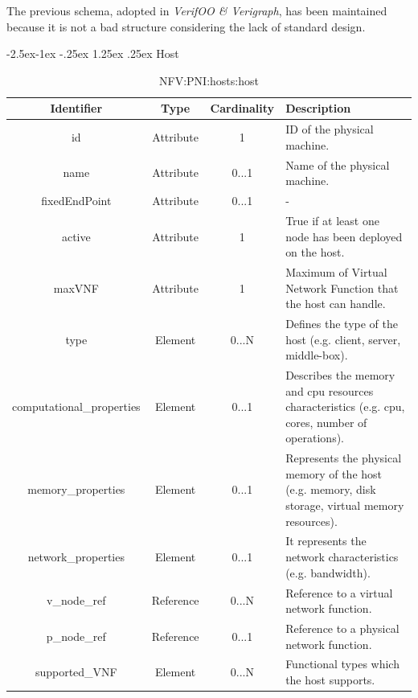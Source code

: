 \documentclass[11pt, english]{article}
\makeatletter
\renewcommand\paragraph{\@startsection{paragraph}{4}{\z@}%
            {-2.5ex\@plus -1ex \@minus -.25ex}%
            {1.25ex \@plus .25ex}%
            {\normalfont\normalsize\bfseries}}
\makeatother
\begin{document}
The previous schema, adopted in \emph{VerifOO \& Verigraph}, has been maintained  because it is not a bad structure considering the lack of standard design.

\paragraph{Host}

\begin{table}[ht]
    \centering
    \begin{tabular}{c|c|c|m{7cm}}
    \hline
    \rowcolor{white}
    Identifier & Type & Cardinality & Description \\
    \hline
    \rowcolor{Gray}
    id & Attribute & 1 & ID of the physical machine. \\
    \hline
    \rowcolor{white}
    name & Attribute & 0...1 & Name of the physical machine. \\
    \hline
    \rowcolor{Gray}
    fixedEndPoint & Attribute & 0...1 & - \\
    \hline
    \rowcolor{white}
    active & Attribute & 1 & True if at least one node has been deployed on the host. \\
    \hline
    \rowcolor{Gray}
    maxVNF & Attribute & 1 & Maximum of Virtual Network Function that the host can handle. \\
    \hline
    \rowcolor{white}
    type & Element & 0...N & Defines the type of the host (e.g. client, server, middle-box). \\
    \hline
    \rowcolor{Gray}
    computational\_properties & Element & 0...1 & Describes the memory and cpu resources characteristics (e.g. cpu, cores, number of operations). \\
    \hline
    \rowcolor{white}
    memory\_properties & Element & 0...1 & Represents the physical memory of the host (e.g. memory, disk storage, virtual memory resources). \\
    \hline
    \rowcolor{Gray}
    network\_properties & Element & 0...1 & It represents the network characteristics (e.g. bandwidth). \\
    \hline
    \rowcolor{white}
    v\_node\_ref & Reference & 0...N & Reference to a virtual network function. \\
    \hline
    \rowcolor{Gray}
    p\_node\_ref & Reference & 0...1 & Reference to a physical network function. \\
    \hline
    \rowcolor{white}
    supported\_VNF & Element & 0...N & Functional types which the host supports. \\
    \hline
    \end{tabular}
    \caption{NFV:PNI:hosts:host} \label{tab:tab4}
\end{table}
\end{document}
